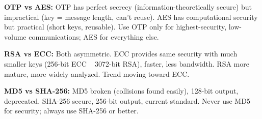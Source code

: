 \documentclass[11pt,a4paper]{report}
\begin{document}
\textbf{OTP vs AES:} OTP has perfect secrecy (information-theoretically secure) but impractical (key = message length, can't reuse). AES has computational security but practical (short keys, reusable). Use OTP only for highest-security, low-volume communications; AES for everything else.

\textbf{RSA vs ECC:} Both asymmetric. ECC provides same security with much smaller keys (256-bit ECC ~ 3072-bit RSA), faster, less bandwidth. RSA more mature, more widely analyzed. Trend moving toward ECC.

\textbf{MD5 vs SHA-256:} MD5 broken (collisions found easily), 128-bit output, deprecated. SHA-256 secure, 256-bit output, current standard. Never use MD5 for security; always use SHA-256 or better.
\end{document}

